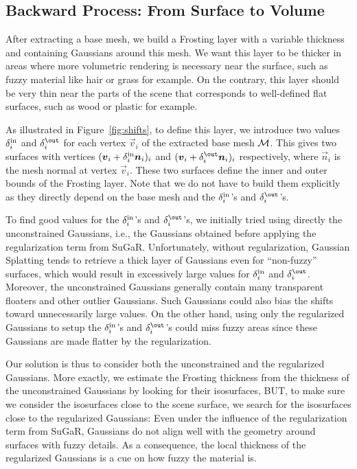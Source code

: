 \subsection{Backward Process: From Surface to Volume}
\label{sec:shifts}

After extracting a base mesh, we build a Frosting layer with a variable thickness and containing Gaussians around this mesh. We want this layer to be thicker in areas where more volumetric rendering is necessary near the surface, such as fuzzy material like hair or grass for example. On the contrary, this layer should be very thin near the parts of the scene that corresponds to well-defined flat surfaces, such as wood or plastic for example.



As illustrated in Figure~\ref{fig:shifts}, to define this layer, we introduce two values $\delta^{\text{in}}_i$ and $\outershift_i$ for each vertex $\vec{v}_i$ of the extracted base mesh ${\cal M}$. This gives two surfaces with vertices $(\vec{v}_i+\innershift_i \vec{n}_i)_i$ and $(\vec{v}_i+\outershift_i \vec{n}_i)_i$ respectively, where $\vec{n}_i$ is the mesh normal at vertex $\vec{v}_i$. These two surfaces define the inner and outer bounds of the Frosting layer. Note that we do not have to build them explicitly as they directly depend on the base mesh and the $\delta^{\text{in}}_i$'s and $\outershift_i$'s.


To find good values for the $\delta^{\text{in}}_i$'s and $\outershift_i$'s, we initially tried using directly the unconstrained Gaussians, i.e., the Gaussians obtained before applying the regularization term from SuGaR.  Unfortunately, without regularization, Gaussian Splatting tends to retrieve a thick layer of Gaussians even for ``non-fuzzy'' surfaces, which would result in excessively large values for $\delta^{\text{in}}_i$ and $\outershift_i$.  Moreover, the unconstrained Gaussians generally contain many transparent floaters and other outlier Gaussians. Such Gaussians could also bias the shifts toward unnecessarily large values. On the other hand, using only the regularized Gaussians to setup the $\delta^{\text{in}}_i$'s and $\outershift_i$'s could miss fuzzy areas since these Gaussians are made flatter by the regularization.


Our solution is thus to consider both the unconstrained and the regularized Gaussians.  More exactly, we estimate the Frosting thickness from the thickness of the unconstrained Gaussians by looking for their isosurfaces, BUT, to make sure we consider the isosurfaces close to the scene surface, we search for the isosurfaces close to the regularized Gaussians: Even under the influence of the regularization term from SuGaR, Gaussians do not align well with the geometry around surfaces with fuzzy details.  As a consequence, the local thickness of the regularized Gaussians is a cue on how fuzzy the material is.



